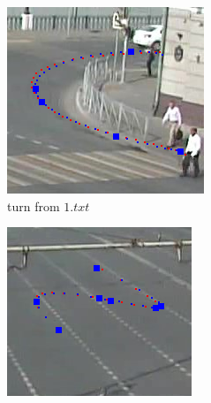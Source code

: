 \begin{figure}[!htb]
\begin{subfigure}[!htb]{0.3\textwidth}
	\end{subfigure}
	\hfill
	\begin{subfigure}[!htb]{0.3\textwidth}
		\centering{}
		\includegraphics[width=\textwidth]{images/regr_kp_turn.png}
		\caption{turn from $1.txt$}
	\end{subfigure}
	\hfill
	\begin{subfigure}[!htb]{0.3\textwidth}
		\centering{}
		\includegraphics[width=\textwidth]{images/regr_kp_complex.png}

\end{subfigure}
\end{figure}
